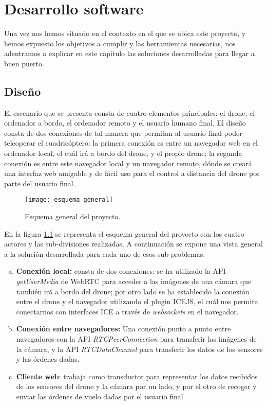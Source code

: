 \chapter{Desarrollo software}

Una vez nos hemos situado en el contexto en el que se ubica este proyecto, y hemos expuesto los objetivos a cumplir y las herramientas necesarias, nos adentramos a explicar en este capítulo las soluciones desarrolladas para llegar a buen puerto.\\

\section{Diseño}

El escenario que se presenta consta de cuatro elementos principales: el drone, el ordenador a bordo, el ordenador remoto y el usuario humano final. El diseño consta de dos conexiones de tal manera que permitan al usuario final poder teleoperar el cuadricóptero: la primera conexión es entre un navegador web en el ordenador local, el cuál irá a bordo del drone, y el propio drone; la segunda conexión es entre este navegador local y un navegador remoto, dónde se creará una interfaz web amigable y de fácil uso para el control a distancia del drone por parte del usuario final.\\

\begin{figure}[h!]
\centering
\texttt{[image: esquema\_general]}
\caption{Esquema general del proyecto.}
\label{fig:esquemageneral}
\end{figure}

En la figura \ref{fig:esquemageneral} se representa el esquema general del proyecto con los cuatro actores y las sub-divisiones realizadas. A continuación se expone una vista general a la solución desarrollada para cada uno de esos sub-problemas:

\begin{enumerate}[(a)]

\item \textbf{Conexión local: }consta de dos conexiones: se ha utilizado la API \emph{getUserMedia} de WebRTC para acceder a las imágenes de una cámara que también irá a bordo del drone; por otro lado se ha establecido la conexión entre el drone y el navegador utilizando el plugin ICEJS, el cuál nos permite conectarnos con interfaces ICE a través de \emph{websockets} en el navegador.

\item \textbf{Conexión entre navegadores:} Una conexión punto a punto entre navegadores con la API \emph{RTCPeerConnection} para transferir las imágenes de la cámara, y la API \emph{RTCDataChannel} para transferir los datos de los sensores y las órdenes dadas. 

\item \textbf{Cliente web}: trabaja como transductor para representar los datos recibidos de los sensores del drone y la cámara por un lado, y por el otro de recoger y enviar las órdenes de vuelo dadas por el usuario final.
\end{enumerate}



